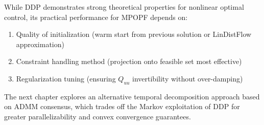 While DDP demonstrates strong theoretical properties for nonlinear optimal control, its practical performance for MPOPF depends on:
\begin{enumerate}
    \item Quality of initialization (warm start from previous solution or LinDistFlow approximation)
    \item Constraint handling method (projection onto feasible set most effective)
    \item Regularization tuning (ensuring $Q_{uu}$ invertibility without over-damping)
\end{enumerate}

The next chapter explores an alternative temporal decomposition approach based on ADMM consensus, which trades off the Markov exploitation of DDP for greater parallelizability and convex convergence guarantees.
